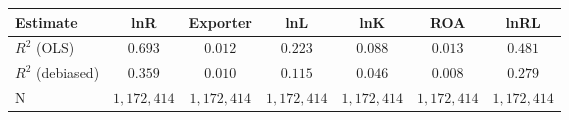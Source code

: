 \begin{tabular}{l*{6}{c}}
\hline\hline
 Estimate & lnR & Exporter & lnL & lnK & ROA & lnRL \\
\hline
\addlinespace $ R^2$ (OLS) & $0.693$ & $0.012$ & $0.223$ & $0.088$ & $0.013$ & $0.481$ \\
$ R^2$ (debiased) & $0.359$ & $0.010$ & $0.115$ & $0.046$ & $0.008$ & $0.279$ \\
N & $1,172,414$ & $1,172,414$ & $1,172,414$ & $1,172,414$ & $1,172,414$ & $1,172,414$ \\
\hline\hline
\end{tabular}
